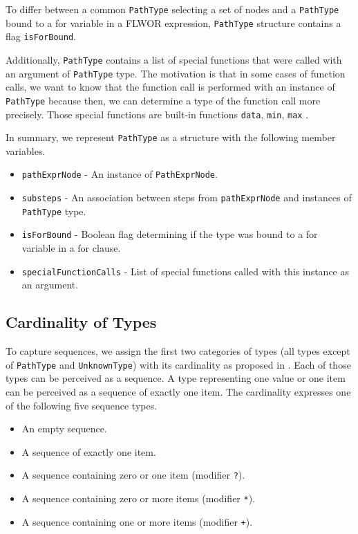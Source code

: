 To differ between a common \texttt{PathType} selecting a set of nodes and a \texttt{PathType} bound to a for variable in a FLWOR expression, \texttt{PathType} structure contains a flag \texttt{isForBound}.

Additionally, \texttt{PathType} contains a list of special functions that were called with an argument of \texttt{PathType} type. The motivation is that in some cases of function calls, we want to know that the function call is performed with an instance of \texttt{PathType} because then, we can determine a type of the function call more precisely. Those special functions are built-in functions \texttt{data}, \texttt{min}, \texttt{max} .

In summary, we represent \texttt{PathType} as a structure with the following member variables.
\begin{itemize}
\item \texttt{pathExprNode} - An instance of \texttt{PathExprNode}.
\item \texttt{substeps} - An association between steps from \texttt{pathExprNode} and instances of \texttt{PathType} type.
\item \texttt{isForBound} - Boolean flag determining if the type was bound to a for variable in a for clause.
\item \texttt{specialFunctionCalls} - List of special functions called with this instance as an argument.
\end{itemize}

\subsection{Cardinality of Types}

To capture sequences, we assign the first two categories of types (all types except of \texttt{PathType} and \texttt{UnknownType}) with its cardinality as proposed in . Each of those types can be perceived as a sequence. A type representing one value or one item can be perceived as a sequence of exactly one item. The cardinality expresses one of the following five sequence types.

\begin{itemize}
\item An empty sequence.
\item A sequence of exactly one item.
\item A sequence containing zero or one item (modifier \texttt{?}).
\item A sequence containing zero or more items (modifier \texttt{*}).
\item A sequence containing one or more items (modifier \texttt{+}).
\end{itemize}

